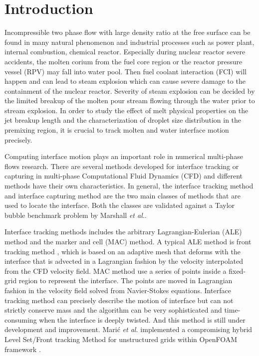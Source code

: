 \section{Introduction}
Incompressible two phase flow with large density ratio at the free surface can be found in many natural phenomenon and industrial processes such as power plant, internal combustion, chemical reactor. Especially during nuclear reactor severe accidents, the molten corium from the fuel core region or the reactor pressure vessel (RPV) may fall into water pool. Then fuel coolant interaction (FCI) will happen and can lead to steam explosion which can cause severe damage to the containment of the nuclear reactor. Severity of steam explosion can be decided by the limited breakup of the molten pour stream flowing through the water prior to stream explosion\cite{Ginsberg1986Liquid}. In order to study the effect of melt physical properties on the jet breakup length and the characterization of droplet size distribution in the premixing region, it is crucial to track molten and water interface motion precisely.

Computing interface motion plays an important role in numerical multi-phase flows research. There are several methods developed for interface tracking or capturing in multi-phase Computational Fluid Dynamics (CFD) and different methods have their own characteristics. In general, the interface tracking method and interface capturing method are the two main classes of methods that are used to locate the interface. Both the classes are validated against a Taylor bubble benchmark problem by Marshall \textit{et al.}\cite{marschall2014validation}.

Interface tracking methods includes the arbitrary Lagrangian-Eulerian (ALE) method and the marker and cell (MAC) method. A typical ALE method is front tracking method \cite{Unverdi1992A,TRYGGVASON2001708}, which is based on an adaptive mesh that deforms with the interface that is advected in a Lagrangian fashion by the velocity interpolated from the CFD velocity field. MAC method use a series of points inside a fixed-grid region to represent the interface. The points are moved in Lagrangian fashion in the velocity field solved from Navier-Stokes equations. Interface tracking method can precisely describe the motion of interface but can not strictly conserve mass and the algorithm can be very sophisticated and time-consuming when the interface is deeply twisted. And this method is still under development and improvement. Mari{\'c} \textit{et al.} implemented a compromising hybrid Level Set/Front tracking Method for unstructured grids within OpenFOAM framework \citep{MARIC201520}.

